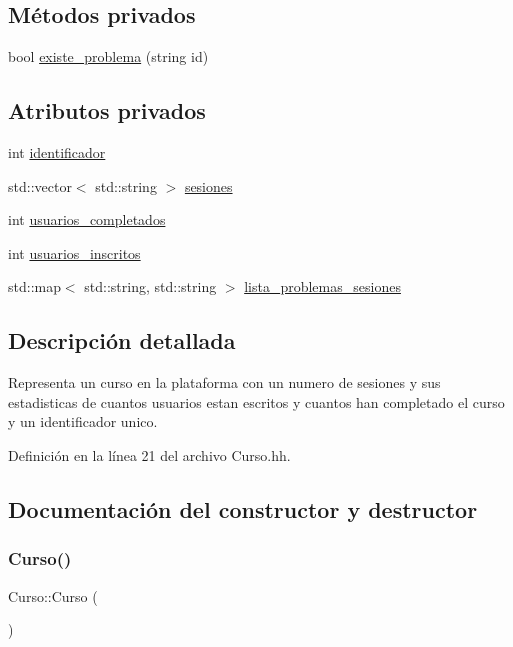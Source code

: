 \subsection*{Métodos privados}
\begin{DoxyCompactItemize}
\item 
bool \mbox{\hyperlink{class_curso_ac697ad831382b4e3ccd85365e835344f}{existe\+\_\+problema}} (string id)
\end{DoxyCompactItemize}
\subsection*{Atributos privados}
\begin{DoxyCompactItemize}
\item 
int \mbox{\hyperlink{class_curso_aa719041069be2a3f1a093a881ae7a105}{identificador}}
\item 
std\+::vector$<$ std\+::string $>$ \mbox{\hyperlink{class_curso_a53e0e57eb6d683a83752082d633a03bc}{sesiones}}
\item 
int \mbox{\hyperlink{class_curso_a63f5480299c87c260ba262831ba7a86f}{usuarios\+\_\+completados}}
\item 
int \mbox{\hyperlink{class_curso_a94c41191b9cd9dc8af95e7d2560a2381}{usuarios\+\_\+inscritos}}
\item 
std\+::map$<$ std\+::string, std\+::string $>$ \mbox{\hyperlink{class_curso_a99375622457c06d91cdeede8686f6da5}{lista\+\_\+problemas\+\_\+sesiones}}
\end{DoxyCompactItemize}


\subsection{Descripción detallada}
Representa un curso en la plataforma con un numero de sesiones y sus estadisticas de cuantos usuarios estan escritos y cuantos han completado el curso y un identificador unico. 

Definición en la línea 21 del archivo Curso.\+hh.



\subsection{Documentación del constructor y destructor}
\mbox{\label{class_curso_add3bcc7fd065fa02b8fad76cedcc3a8a}} 
\subsubsection{\texorpdfstring{Curso()}{Curso()}\hspace{0.1cm}{\footnotesize\ttfamily [1/2]}}
{\footnotesize\ttfamily Curso\+::\+Curso (\begin{DoxyParamCaption}{ }\end{DoxyParamCaption})}



